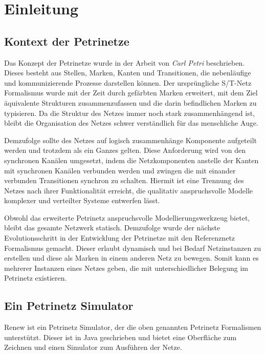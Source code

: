 \chapter{Einleitung}

\section{Kontext der Petrinetze} \label{sec:KdP} 

Das Konzept der Petrinetze wurde in der Arbeit von \textit{Carl Petri} beschrieben. Dieses besteht aus Stellen, Marken, Kanten und Transitionen, die nebenläufige und kommunizierende Prozesse darstellen können. Der ursprüngliche S/T-Netz Formalismus wurde mit der Zeit durch gefärbten Marken erweitert, mit dem Ziel äquivalente Strukturen zusammenzufassen und die darin befindlichen Marken zu typisieren. Da die Struktur des Netzes immer noch stark zusammenhängend ist, bleibt die Organisation des Netzes schwer verständlich für das menschliche Auge.


Demzufolge sollte des Netzes auf logisch zusammenhänge Komponente aufgeteilt werden und trotzdem als ein Ganzes gelten. Diese Anforderung wird von den synchronen Kanälen umgesetzt, indem die Netzkomponenten anstelle der Kanten mit synchronen Kanälen verbunden werden und zwingen die mit einander verbunden Transitionen synchron zu schalten. Hiermit ist eine Trennung des Netzes nach ihrer Funktionalität erreicht, die qualitativ anspruchsvolle Modelle komplexer und verteilter Systeme entwerfen lässt.\bigbreak


Obwohl das erweiterte Petrinetz anspruchsvolle Modellierungswerkzeug bietet, bleibt das gesamte Netzwerk statisch. Demzufolge wurde der nächste Evolutionsschritt in der Entwicklung der Petrinetze mit den Referenznetz Formalismus gemacht. Dieser erlaubt dynamisch und bei Bedarf Netzinstanzen zu erstellen und diese als Marken in einem anderen Netz zu bewegen. Somit kann es mehrerer Instanzen eines Netzes geben, die mit unterschiedlicher Belegung im Petrinetz existieren.  

\section{Ein Petrinetz Simulator} \label{sec:EPS}

Renew ist ein Petrinetz Simulator, der die oben genannten Petrinetz Formalismen unterstützt. Dieser ist in Java geschrieben und bietet eine Oberfläche zum Zeichnen und einen Simulator zum Ausführen der Netze.


